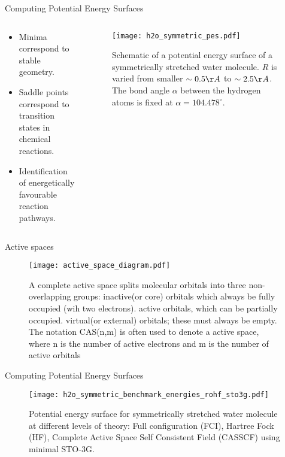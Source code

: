 \begin{frame}{Computing Potential Energy Surfaces}
  \begin{columns}
    \begin{column}{0.5\linewidth}
      \begin{itemize}
        \setlength\itemsep{0.1em}
        \item Minima correspond to {\color{red}stable geometry}.
        \item Saddle points correspond to {\color{red}transition states} in chemical reactions.
        \item Identification of energetically favourable reaction pathways.
      \end{itemize}
    \end{column}
    \begin{column}{0.5\linewidth}
      \begin{figure}
        \centering
        \texttt{[image: h2o\_symmetric\_pes.pdf]}
        \caption{
          Schematic of a potential energy surface of a symmetrically stretched water molecule.
          $R$ is varied from smaller $\sim 0.5 \AA$ to $\sim 2.5 \AA$. The bond angle $\alpha$ between
          the hydrogen atoms is fixed at $\alpha = 104.478 ^{\circ}$.
        }
      \end{figure}
    \end{column}
  \end{columns}
\end{frame}


\begin{frame}{Active spaces}
    \begin{figure}
      \centering
      \texttt{[image: active\_space\_diagram.pdf]}
      \caption{
        A complete active space splits molecular orbitals into three non-overlapping groups:
        {\color{red}inactive}(or core) orbitals which always be fully occupied (wih two electrons).
        {\color{red}active} orbitals, which can be partially occupied.
        {\color{red}virtual}(or external) orbitals; these must always be empty.
        The notation CAS(n,m) is often used to denote a active space,
        where n is the number of active electrons and m is the number of active orbitals
      }
    \end{figure}

\end{frame}


\begin{frame}{Computing Potential Energy Surfaces}
    \begin{figure}
      \centering
      \texttt{[image: h2o\_symmetric\_benchmark\_energies\_rohf\_sto3g.pdf]}
      \caption{
        Potential energy surface for symmetrically stretched water molecule
        at different levels of theory: Full configuration (FCI), Hartree Fock (HF),
        Complete Active Space Self Consistent Field (CASSCF) using minimal STO-3G.
      }
    \end{figure}
\end{frame}



